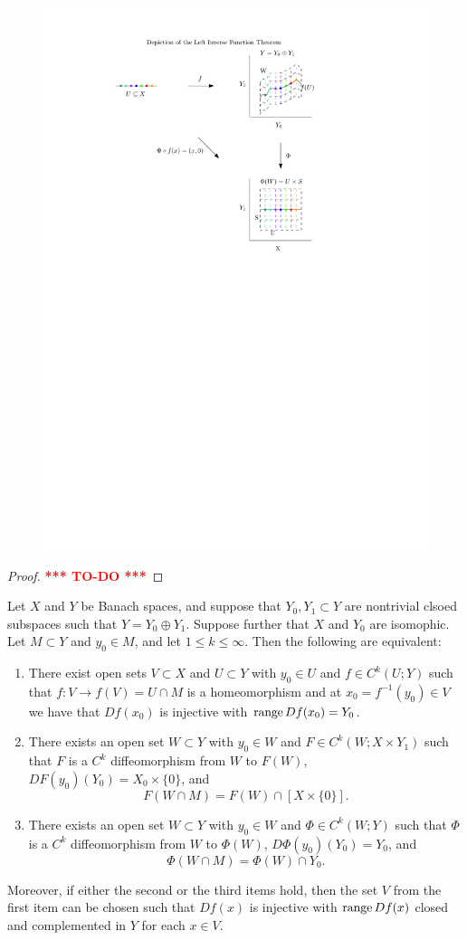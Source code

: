 \documentclass[a4paper]{article}
\newcommand{\TODO}{\textcolor{red}{\textbf{*** TO-DO ***}}}
\begin{document}
\begin{figure}[!ht]
  \centering
  \includegraphics[width=0.7\linewidth]{fig/left_inverse.pdf}
\end{figure}

\begin{proof}
\TODO
\end{proof}

\begin{thm}
Let $X$ and $Y$ be Banach spaces, and suppose that
$Y_0, Y_1 \subset Y$ are nontrivial clsoed subspaces
such that $Y = Y_0 \oplus Y_1$. Suppose further that
$X$ and $Y_0$ are isomophic. Let $M \subset Y$ and
$y_0 \in M$, and let $1 \leq k \leq \infty$. Then the
following are equivalent:
\begin{enumerate}
\item There exist open sets $V \subset X$ and $U \subset Y$
with $y_0 \in U$ and $f \in C^k(U ; Y)$ such that $f :
V \to f(V) = U \cap M$ is a homeomorphism and at $x_0
= f^{-1}(y_0) \in V$ we have that $Df(x_0)$ is injective
with $\operatorname{range} Df(x_0) = Y_0$.

\item There exists an open set $W \subset Y$ with $y_0 \in W$
and $F \in C^k(W ; X \times Y_1)$ such that $F$ is a
$C^k$ diffeomorphism from $W$ to $F(W)$, $DF(y_0)(Y_0)
= X_0 \times \{0\}$, and
\[
F(W \cap M) = F(W) \cap [X \times \{0\}].
\]

\item There exists an open set $W \subset Y$ with $y_0 \in W$
and $\Phi \in C^k(W ; Y)$ such that $\Phi$ is a $C^k$
diffeomorphism from $W$ to $\Phi(W)$, $D \Phi(y_0) (Y_0)
= Y_0$, and
\[
\Phi(W \cap M) = \Phi(W) \cap Y_0.
\]
\end{enumerate}

Moreover, if either the second or the third items hold, then
the set $V$ from the first item can be chosen such that
$Df(x)$ is injective with $\operatorname{range} Df(x)$ closed and
complemented in $Y$ for each $x \in V$.
\end{thm}
\end{document}
